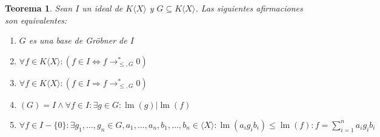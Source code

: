 \documentclass[12pt]{report}
\theoremstyle{customstyle}
\newtheorem{theorem}{Teorema}[chapter]
\theoremstyle{factstyle}
\DeclareMathOperator{\lm}{lm}
\begin{document}
\begin{theorem}\label{thm:equivalencias de base de Gröbner}
  Sean $I$ un ideal de $K⟨X⟩$ y $G ⊆ K⟨X⟩$. Las siguientes afirmaciones son equivalentes:
  \begin{enumerate}
    \item $G$ es una base de Gröbner de $I$

    \item $∀f ∈ K⟨X⟩ : (f ∈ I ⇔ f →^*_{≤, G} 0)$

    \item $∀f ∈ K⟨X⟩ : (f ∈ I ⇒ f →^*_{≤, G} 0)$

    \item $(G) = I ∧ ∀f ∈ I : ∃g ∈ G : \lm(g) | \lm(f)$

    \item $∀f ∈ I - \{0\} : ∃g_1, …, g_n ∈ G, a_1, …, a_n, b_1, …, b_n ∈ ⟨X⟩ : \lm(a_i g_i b_i) ≤ \lm(f) : f = ∑_{i = 1}^n a_i g_i b_i$
  \end{enumerate}

\end{theorem}
\end{document}
